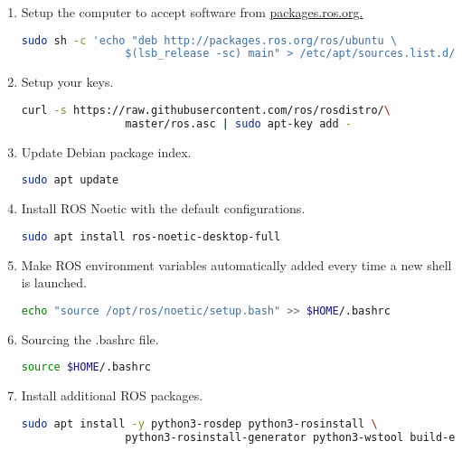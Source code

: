 \documentclass{CSSRforAfrica}
\begin{document}
{{\begin{enumerate}
				\item Setup the computer to accept software from \href{http://packages.ros.org}{packages.ros.org.}
				\begin{lstlisting}[style=withoutNumbering, language=bash]
				sudo sh -c 'echo "deb http://packages.ros.org/ros/ubuntu \
				$(lsb_release -sc) main" > /etc/apt/sources.list.d/ros-latest.list'
				\end{lstlisting}
				
				\item Setup your keys.
				\begin{lstlisting}[style=withoutNumbering, language=bash]
				curl -s https://raw.githubusercontent.com/ros/rosdistro/\
				master/ros.asc | sudo apt-key add -     
				\end{lstlisting}           
				
				\item Update Debian package index.
				\begin{lstlisting}[style=withoutNumbering, language=bash]
				sudo apt update    
				\end{lstlisting}
				
				\item Install ROS Noetic with the default configurations.
				
				\begin{lstlisting}[style=withoutNumbering, language=bash]
				sudo apt install ros-noetic-desktop-full
				\end{lstlisting}
				
				\item Make ROS environment variables automatically added every time a new shell is launched.
				\begin{lstlisting}[style=withoutNumbering, language=bash]
				echo "source /opt/ros/noetic/setup.bash" >> $HOME/.bashrc
				\end{lstlisting}
				
				\item Sourcing the .bashrc file.
				\begin{lstlisting}[style=withoutNumbering, language=bash]
				source $HOME/.bashrc
				\end{lstlisting}
				
				\item Install additional ROS packages.
				\begin{lstlisting}[style=withoutNumbering, language=bash]
				sudo apt install -y python3-rosdep python3-rosinstall \
				python3-rosinstall-generator python3-wstool build-essential
				\end{lstlisting}
				

\end{enumerate}}}
\end{document}
